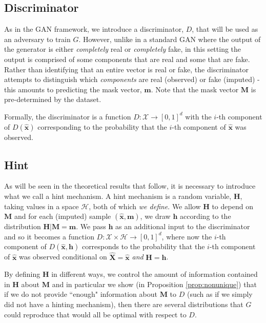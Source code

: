 \documentclass{article}
\begin{document}
\subsection{Discriminator}
As in the GAN framework, we introduce a discriminator, $D$, that will be used as an adversary to train $G$. However, unlike in a standard GAN where the output of the generator is either {\em completely} real or {\em completely} fake, in this setting the output is comprised of some components that are real and some that are fake. Rather than identifying that an entire vector is real or fake, the discriminator attempts to distinguish which {\em components} are real (observed) or fake (imputed) - this amounts to predicting the mask vector, $\mathbf{m}$. Note that the mask vector $\mathbf{M}$ is pre-determined by the dataset.

Formally, the discriminator is a function $D: \mathcal{X} \to [0, 1]^d$ with the $i$-th component of $D(\hat{\mathbf{x}})$ corresponding to the probability that the $i$-th component of $\hat{\mathbf{x}}$ was observed.

\subsection{Hint} \label{subsec:hint}
As will be seen in the theoretical results that follow, it is necessary to introduce what we call a hint mechanism. A hint mechanism is a random variable, $\mathbf{H}$, taking values in a space $\mathcal{H}$, both of which {\em we define}. We allow $\mathbf{H}$ to depend on $\mathbf{M}$ and for each (imputed) sample $(\hat{\mathbf{x}}, \mathbf{m})$, we draw $\mathbf{h}$ according to the distribution $\mathbf{H} | \mathbf{M} = \mathbf{m}$. We pass $\mathbf{h}$ as an additional input to the discriminator and so it becomes a function $D: \mathcal{X} \times \mathcal{H} \to [0, 1]^d$, where now the $i$-th component of $D(\hat{\mathbf{x}}, \mathbf{h})$ corresponds to the probability that the $i$-th component of $\hat{\mathbf{x}}$ was observed conditional on $\hat{\mathbf{X}} = \hat{\mathbf{x}}$ {\em and} $\mathbf{H} = \mathbf{h}$.

By defining $\mathbf{H}$ in different ways, we control the amount of information contained in $\mathbf{H}$ about $\mathbf{M}$ and in particular we show (in Proposition \ref{prop:nonunique}) that if we do not provide ``enough" information about $\mathbf{M}$ to $D$ (such as if we simply did not have a hinting mechanism), then there are several distributions that $G$ could reproduce that would all be optimal with respect to $D$.
\end{document}
